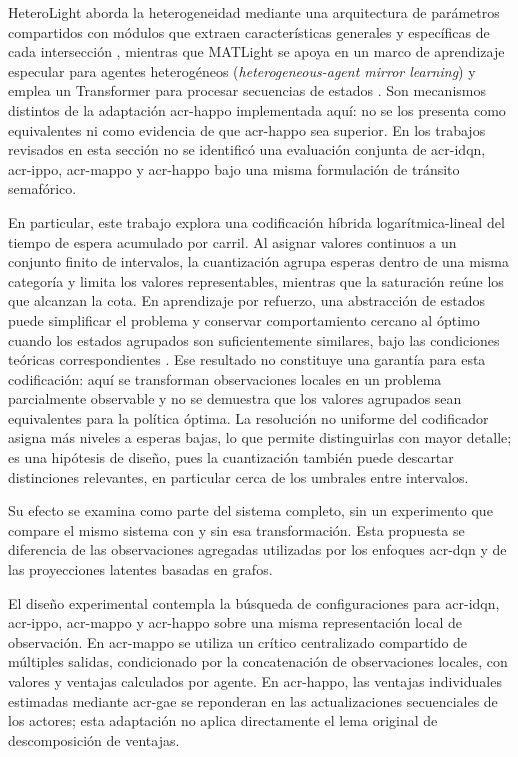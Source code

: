 HeteroLight aborda la heterogeneidad mediante una arquitectura de parámetros compartidos con módulos que extraen características generales y específicas de cada intersección \cite{heterolight2024}, mientras que MATLight se apoya en un marco de aprendizaje especular para agentes heterogéneos (\textit{heterogeneous-agent mirror learning}) y emplea un Transformer para procesar secuencias de estados \cite{matlight2024}. Son mecanismos distintos de la adaptación \acrshort{acr-happo} implementada aquí: no se los presenta como equivalentes ni como evidencia de que \acrshort{acr-happo} sea superior. En los trabajos revisados en esta sección no se identificó una evaluación conjunta de \acrshort{acr-idqn}, \acrshort{acr-ippo}, \acrshort{acr-mappo} y \acrshort{acr-happo} bajo una misma formulación de tránsito semafórico.

En particular, este trabajo explora una codificación híbrida logarítmica-lineal del tiempo de espera acumulado por carril. Al asignar valores continuos a un conjunto finito de intervalos, la cuantización agrupa esperas dentro de una misma categoría y limita los valores representables, mientras que la saturación reúne los que alcanzan la cota. En aprendizaje por refuerzo, una abstracción de estados puede simplificar el problema y conservar comportamiento cercano al óptimo cuando los estados agrupados son suficientemente similares, bajo las condiciones teóricas correspondientes \cite{abel2016approxabstraction}. Ese resultado no constituye una garantía para esta codificación: aquí se transforman observaciones locales en un problema parcialmente observable y no se demuestra que los valores agrupados sean equivalentes para la política óptima. La resolución no uniforme del codificador asigna más niveles a esperas bajas, lo que permite distinguirlas con mayor detalle; es una hipótesis de diseño, pues la cuantización también puede descartar distinciones relevantes, en particular cerca de los umbrales entre intervalos.

Su efecto se examina como parte del sistema completo, sin un experimento que compare el mismo sistema con y sin esa transformación. Esta propuesta se diferencia de las observaciones agregadas utilizadas por los enfoques \acrshort{acr-dqn} y de las proyecciones latentes basadas en grafos.

El diseño experimental contempla la búsqueda de configuraciones para \acrshort{acr-idqn}, \acrshort{acr-ippo}, \acrshort{acr-mappo} y \acrshort{acr-happo} sobre una misma representación local de observación. En \acrshort{acr-mappo} se utiliza un crítico centralizado compartido de múltiples salidas, condicionado por la concatenación de observaciones locales, con valores y ventajas calculados por agente. En \acrshort{acr-happo}, las ventajas individuales estimadas mediante \acrshort{acr-gae} se reponderan en las actualizaciones secuenciales de los actores; esta adaptación no aplica directamente el lema original de descomposición de ventajas.

